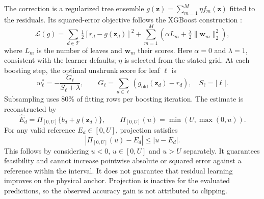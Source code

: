 \documentclass[11pt,a4paper]{article}
\begin{document}
The correction is a regularized tree ensemble $g(\bm z)=\sum_{m=1}^{M}\eta f_m(\bm z)$ fitted to the residuals. Its squared-error objective follows the XGBoost construction \cite{chen2016}:
\begin{equation}
 \mathcal L(g)=\sum_{d\in\mathcal T}\tfrac12[r_d-g(\bm z_d)]^2+
 \sum_{m=1}^{M}\left(\alpha L_m+\tfrac{\lambda}{2}\|\bm w_m\|_2^2\right),
 \label{eq:objective}
\end{equation}
where $L_m$ is the number of leaves and $\bm w_m$ their scores. Here $\alpha=0$ and $\lambda=1$, consistent with the learner defaults; $\eta$ is selected from the stated grid. At each boosting step, the optimal unshrunk score for leaf $\ell$ is
\begin{equation}
 w_\ell^{*}=-\frac{G_\ell}{S_\ell+\lambda},\qquad
 G_\ell=\sum_{d\in\ell}(g_{\mathrm{old}}(\bm z_d)-r_d),\quad S_\ell=|\ell|.
 \label{eq:leaf}
\end{equation}
Subsampling uses 80\% of fitting rows per boosting iteration. The estimate is reconstructed by
\begin{equation}
 \widehat E_d=\Pi_{[0,U]}\{b_d+g(\bm z_d)\},\qquad
 \Pi_{[0,U]}(u)=\min(U,\max(0,u)).
 \label{eq:projection}
\end{equation}
For any valid reference $E_d\in[0,U]$, projection satisfies
\begin{equation}
 |\Pi_{[0,U]}(u)-E_d|\leq |u-E_d|.
 \label{eq:nonexpansive}
\end{equation}
This follows by considering $u<0$, $u\in[0,U]$ and $u>U$ separately. It guarantees feasibility and cannot increase pointwise absolute or squared error against a reference within the interval. It does not guarantee that residual learning improves on the physical anchor. Projection is inactive for the evaluated predictions, so the observed accuracy gain is not attributed to clipping.
\end{document}
